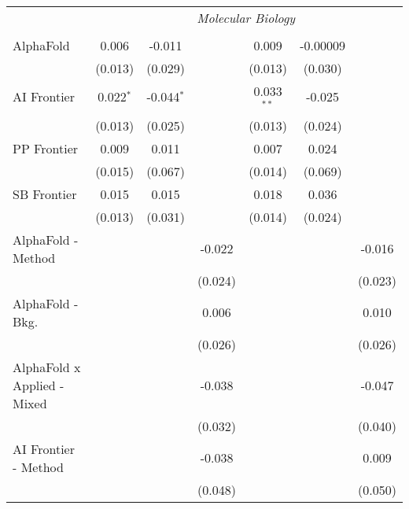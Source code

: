 \begin{tabular}{lcccccc}
 & \multicolumn{6}{c}{\textit{Molecular Biology}} \\ \\
   AlphaFold                     & 0.006       & -0.011       &               & 0.009        & -0.00009 &   \\   
                                 & (0.013)     & (0.029)      &               & (0.013)      & (0.030)  &   \\   
   AI Frontier                   & 0.022$^{*}$ & -0.044$^{*}$ &               & 0.033$^{**}$ & -0.025   &   \\   
                                 & (0.013)     & (0.025)      &               & (0.013)      & (0.024)  &   \\   
   PP Frontier                   & 0.009       & 0.011        &               & 0.007        & 0.024    &   \\   
                                 & (0.015)     & (0.067)      &               & (0.014)      & (0.069)  &   \\   
   SB Frontier                   & 0.015       & 0.015        &               & 0.018        & 0.036    &   \\   
                                 & (0.013)     & (0.031)      &               & (0.014)      & (0.024)  &   \\   
   AlphaFold - Method            &             &              & -0.022        &              &          & -0.016\\   
                                 &             &              & (0.024)       &              &          & (0.023)\\   
   AlphaFold - Bkg.              &             &              & 0.006         &              &          & 0.010\\   
                                 &             &              & (0.026)       &              &          & (0.026)\\   
   AlphaFold x Applied - Mixed   &             &              & -0.038        &              &          & -0.047\\   
                                 &             &              & (0.032)       &              &          & (0.040)\\   
   AI Frontier - Method          &             &              & -0.038        &              &          & 0.009\\   
                                 &             &              & (0.048)       &              &          & (0.050)\\   

\end{tabular}
